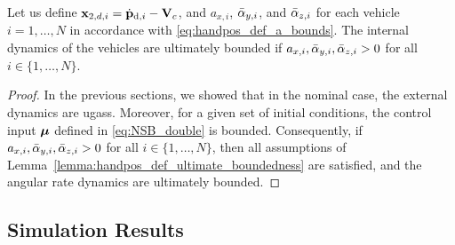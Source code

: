 \begin{prop}
    \label{prop:angular_velocities}
    Let us define $\mathbf{x}_{2, d, i} = \dot{\mathbf{p}}_{{\rm d}, i} - \mathbf{V}_c$, and $a_{x, i}$, $\Bar{\alpha}_{y, i}$, and $\Bar{\alpha}_{z, i}$ for each vehicle $i = 1, \ldots, N$ in accordance with \eqref{eq:handpos_def_a_bounds}.
    The internal dynamics of the vehicles are ultimately bounded if $a_{x, i}, \Bar{\alpha}_{y, i}, \Bar{\alpha}_{z, i} > 0$ for all $i \in \{1, \ldots, N\}$.
\end{prop}

\begin{proof}
    In the previous sections, we showed that in the nominal case, the external dynamics are \glspl{ugas}.
    Moreover, for a given set of initial conditions, the control input $\bm{\mu}$ defined in \eqref{eq:NSB_double} is bounded.
    Consequently, if $a_{x, i}, \Bar{\alpha}_{y, i}, \Bar{\alpha}_{z, i} > 0$ for all $i \in \{1, \ldots, N\}$, then all assumptions of Lemma~\ref{lemma:handpos_def_ultimate_boundedness} are satisfied, and the angular rate dynamics are ultimately bounded.
\end{proof}

\subsection{Simulation Results}\label{sec:simulation}

